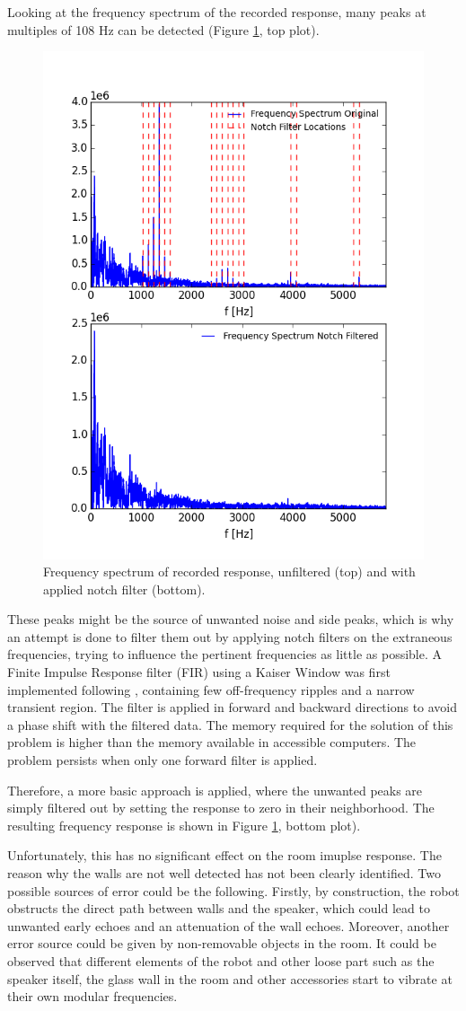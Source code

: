 Looking at the frequency spectrum of the recorded response, many peaks at multiples of 108 Hz can be detected (Figure \ref{fig:RIR_filtered}, top plot). 
\begin{figure}[H]
    \centering
    \includegraphics[width=.5\linewidth]{files/notchY.png}
    \caption{Frequency spectrum of recorded response, unfiltered (top) and with applied notch filter (bottom).}
    \label{fig:RIR_filtered}
\end{figure}
These peaks might be the source of unwanted noise and side peaks, which is why an attempt is done to filter them out by applying notch filters on the extraneous frequencies, trying to influence the pertinent frequencies as little as possible. 
A Finite Impulse Response filter (FIR) using a Kaiser Window was first implemented following \cite{Notch}, containing few off-frequency ripples and a narrow transient region. 
The filter is applied in forward and backward directions to avoid a phase shift with the filtered data. 
The memory required for the solution of this problem is higher than the memory available in accessible computers. The problem persists when only one forward filter is applied. 

Therefore, a more basic approach is applied, where the unwanted peaks are simply filtered out by setting the response to zero in their neighborhood. The resulting frequency response is shown in Figure \ref{fig:RIR_filtered}, bottom plot). 

Unfortunately, this has no significant effect on the room imuplse response. The reason why the walls are not well detected has not been clearly identified. 
Two possible sources of error could be the following.
Firstly, by construction, the robot obstructs the direct path between walls and the speaker, which could lead to unwanted early echoes and an attenuation of the wall echoes.
Moreover, another error source could be given by non-removable objects in the room. 
It could be observed that different elements of the robot and other loose part such as the speaker itself, the glass wall in the room and other accessories start to vibrate at their own modular frequencies. 
